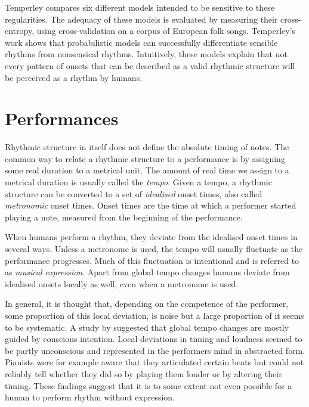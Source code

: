 Temperley compares six different models intended to be sensitive to these regularities. The adequacy of these models is evaluated by measuring their cross-entropy, using cross-validation on a corpus of European folk songs. Temperley's work shows that probabilistic models can successfully differentiate sensible rhythms from nonsensical rhythms. Intuitively, these models explain that not every pattern of onsets that can be described as a valid rhythmic structure will be perceived as a rhythm by humans. 


\section{Performances}
\label{sec:performances}

Rhythmic structure in itself does not define the absolute timing of notes. The common way to relate a rhythmic structure to a performance is by assigning some real duration to a metrical unit. The amount of real time we assign to a metrical duration is usually called the \textit{tempo}. Given a tempo, a rhythmic structure can be converted to a set of \textit{idealised} onset times, also called \textit{metronomic} onset times. Onset times are the time at which a performer started playing a note, measured from the beginning of the performance.

When humans perform a rhythm, they deviate from the idealised onset times in several ways. Unless a metronome is used, the tempo will usually fluctuate as the performance progresses. Much of this fluctuation is intentional and is referred to as \textit{musical expression}. Apart from global tempo changes humans deviate from idealised onsets locally as well, even when a metronome is used. 

In general, it is thought that, depending on the competence of the performer, some proportion of this local deviation, is noise but a large proportion of it seems to be systematic. A study by \citet{palmer1989mapping} suggested that global tempo changes are mostly guided by conscious intention. Local deviations in timing and loudness seemed to be partly unconscious and represented in the performers mind in abstracted form. Pianists were for example aware that they articulated certain beats but could not reliably tell whether they did so by playing them louder or by altering their timing. These findings suggest that it is to some extent not even possible for a human to perform rhythm without expression.

